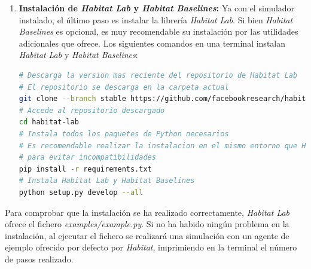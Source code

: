 \begin{enumerate}
	\item \textbf{Instalación de \textit{Habitat Lab} y \textit{Habitat Baselines}:} Ya con el simulador instalado, el último paso es instalar la librería \textit{Habitat Lab}. Si bien \textit{Habitat Baselines} es opcional, es muy recomendable su instalación por las utilidades adicionales que ofrece. Los siguientes comandos en una terminal instalan \textit{Habitat Lab} y \textit{Habitat Baselines}:
	
\begin{lstlisting}[language=bash]
# Descarga la version mas reciente del repositorio de Habitat Lab
# El repositorio se descarga en la carpeta actual
git clone --branch stable https://github.com/facebookresearch/habitat-lab.git
# Accede al repositorio descargado
cd habitat-lab
# Instala todos los paquetes de Python necesarios
# Es recomendable realizar la instalacion en el mismo entorno que Habitat Sim
# para evitar incompatibilidades
pip install -r requirements.txt
# Instala Habitat Lab y Habitat Baselines
python setup.py develop --all
\end{lstlisting}	
\end{enumerate}

Para comprobar que la instalación se ha realizado correctamente, \textit{Habitat Lab} ofrece el fichero \textit{examples/example.py}. Si no ha habido ningún problema en la instalación, al ejecutar el fichero se realizará una simulación con un agente de ejemplo ofrecido por defecto por \textit{Habitat}, imprimiendo en la terminal el número de pasos realizado.
